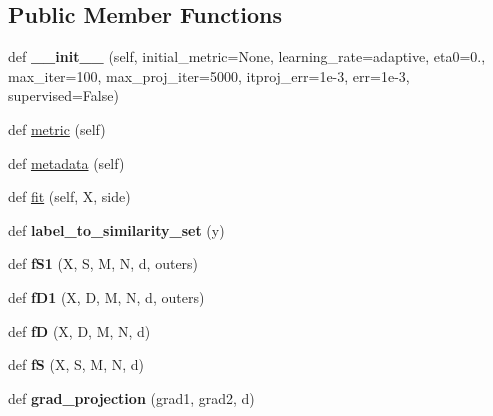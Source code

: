 \subsection*{Public Member Functions}
\begin{DoxyCompactItemize}
\item 
def {\bfseries \+\_\+\+\_\+init\+\_\+\+\_\+} (self, initial\+\_\+metric=None, learning\+\_\+rate=\textquotesingle{}adaptive\textquotesingle{}, eta0=0., max\+\_\+iter=100, max\+\_\+proj\+\_\+iter=5000, itproj\+\_\+err=1e-\/3, err=1e-\/3, supervised=\+False)\hypertarget{classdml_1_1lsi_1_1LSI_ac7b6cb5c0c275e569cacaad9d10bd65f}{}\label{classdml_1_1lsi_1_1LSI_ac7b6cb5c0c275e569cacaad9d10bd65f}

\item 
def \hyperlink{classdml_1_1lsi_1_1LSI_aff08bb1d85ceb7815463dab942c874fe}{metric} (self)
\item 
def \hyperlink{classdml_1_1lsi_1_1LSI_a0b19b5b4c15e9ece71a6cfa99206450e}{metadata} (self)
\item 
def \hyperlink{classdml_1_1lsi_1_1LSI_abf52e31fccbbbb83b3f5ec8fcaeee27a}{fit} (self, X, side)
\item 
def {\bfseries label\+\_\+to\+\_\+similarity\+\_\+set} (y)\hypertarget{classdml_1_1lsi_1_1LSI_a8072dcc31d51a2942653c7d07be24d2c}{}\label{classdml_1_1lsi_1_1LSI_a8072dcc31d51a2942653c7d07be24d2c}

\item 
def {\bfseries f\+S1} (X, S, M, N, d, outers)\hypertarget{classdml_1_1lsi_1_1LSI_adf17afd3275593c0ce6ee6ea860ab32b}{}\label{classdml_1_1lsi_1_1LSI_adf17afd3275593c0ce6ee6ea860ab32b}

\item 
def {\bfseries f\+D1} (X, D, M, N, d, outers)\hypertarget{classdml_1_1lsi_1_1LSI_ab6ab40d92d222f31c12b2801005571c2}{}\label{classdml_1_1lsi_1_1LSI_ab6ab40d92d222f31c12b2801005571c2}

\item 
def {\bfseries fD} (X, D, M, N, d)\hypertarget{classdml_1_1lsi_1_1LSI_a9ffd83da171f9d5f5fabce573cd23cc3}{}\label{classdml_1_1lsi_1_1LSI_a9ffd83da171f9d5f5fabce573cd23cc3}

\item 
def {\bfseries fS} (X, S, M, N, d)\hypertarget{classdml_1_1lsi_1_1LSI_a599aa47db1a73be6cff23ec70c56c28c}{}\label{classdml_1_1lsi_1_1LSI_a599aa47db1a73be6cff23ec70c56c28c}

\item 
def {\bfseries grad\+\_\+projection} (grad1, grad2, d)\hypertarget{classdml_1_1lsi_1_1LSI_acce0d0074acf4c7406559d5155ccc4e7}{}\label{classdml_1_1lsi_1_1LSI_acce0d0074acf4c7406559d5155ccc4e7}

\end{DoxyCompactItemize}
